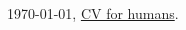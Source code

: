 \documentclass[10pt,A4,english]{article}
\begin{document}
\begin{paracol}{2}
\begin{rightcolumn}
\begin{itemize}[leftmargin=*]
\end{itemize}
\mbox{}
\vfill


\today, \href{https://sebastianof.github.io/GeoDsBlog/about/CV_modern/curriculum.pdf}{CV for humans}. \hspace{1cm}   \hrulefill


\end{rightcolumn}
\end{paracol}
\end{document}
